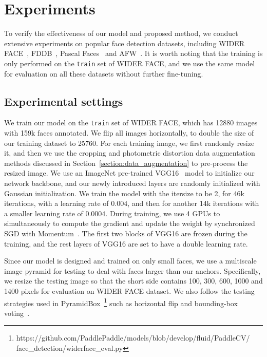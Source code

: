 \documentclass[10pt,twocolumn,letterpaper]{article}
\begin{document}
\section{Experiments}\label{sec:exp}
To verify the effectiveness of our model and proposed method, we conduct extensive experiments
on popular face detection datasets, including WIDER FACE~\cite{yang2016wider}, FDDB~\cite{fddbTech}, Pascal Faces~\cite{yan2014face} and AFW~\cite{zhu2012face}.
It is worth noting that the training is only performed on the \texttt{train} set of WIDER FACE,
and we use the same model for evaluation on all these datasets without further fine-tuning.
\subsection{Experimental settings}
We train our model on the \texttt{train} set of WIDER FACE, which has 12880 images with
159k faces annotated. We flip all images horizontally, to
double the size of our training dataset to 25760.
For each training image, we first randomly resize it,
and then we use the cropping and photometric distortion data
augmentation methods discussed in Section~\ref{section:data_augmentation} to pre-process
the resized image. We use an ImageNet pre-trained
VGG16~\cite{krizhevsky2012imagenet} model to initialize our network backbone, and our newly
introduced layers are randomly initialized with Gaussian initialization. We train the
model with the itersize to be 2, for 46k iterations, with a learning rate of $0.004$, and
then for another 14k iterations
with a smaller learning rate of $0.0004$.
During training, we use 4 GPUs to simultaneously to compute the gradient and update the weight by
synchronized SGD with
Momentum~\cite{qian1999momentum}. The first two blocks of VGG16 are frozen during the training,
and the rest
layers of VGG16 are set to have a double learning rate.

Since our model is designed and trained on only small faces, we use a multiscale image
pyramid for testing to deal with faces larger than our anchors. Specifically, we resize
the testing image so that the short side contains 100, 300, 600, 1000 and 1400 pixels
for evaluation on WIDER FACE dataset. We also follow the testing strategies used in PyramidBox~\cite{Tang_2018_ECCV}\footnote{https://github.com/PaddlePaddle/models/blob/develop/fluid/PaddleCV/
face\_detection/widerface\_eval.py} such as horizontal flip and
bounding-box voting~\cite{gidaris2015object}.
\end{document}
